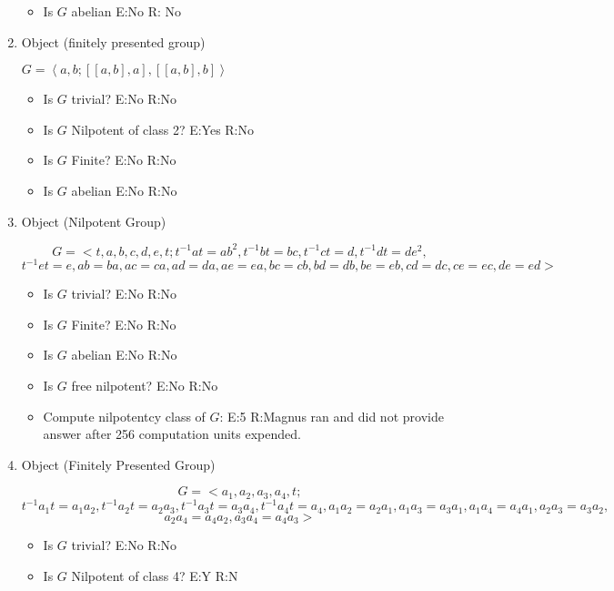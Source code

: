 \documentclass{article}
\begin{document}
\begin{enumerate}
\begin{itemize}
\item Is $G$ abelian E:No R: No
\end{itemize}
\item Object (finitely presented group)

$G=\left<a,b; [[a,b],a], [[a,b],b] \right>$

\begin{itemize}
\item Is $G$ trivial? E:No  R:No

\item Is $G$ Nilpotent of class 2? E:Yes R:No


\item Is $G$ Finite? E:No R:No

\item Is $G$ abelian E:No R:No
\end{itemize}

\item Object (Nilpotent Group)

\[G=<t,a,b,c,d,e,t; t^{-1}at=ab^2, t^{-1}bt=bc, t^{-1}ct=d,t^{-1}dt=de^2, \]\[ t^{-1}et=e, ab=ba, ac=ca, ad=da, ae=ea, bc=cb, bd=db, be=eb, cd=dc,  ce=ec, de=ed > \]

\begin{itemize}

\item Is $G$ trivial? E:No  R:No

\item Is $G$ Finite? E:No R:No

\item Is $G$ abelian E:No R:No

\item Is $G$ free nilpotent? E:No R:No

\item Compute nilpotentcy class of $G$: E:5 R:Magnus ran and did not provide answer after 256 computation units expended.
\end{itemize}

\item Object (Finitely Presented Group)

\[G=<a_1,a_2,a_3,a_4,t; \] \[ t^{-1}a_1t=a_1a_2, t^{-1}a_2t=a_2a_3,t^{-1}a_3t=a_3a_4, t^{-1}a_4t=a_4, a_1a_2=a_2a_1, a_1a_3=a_3a_1,
a_1a_4=a_4a_1, a_2a_3=a_3a_2, \]\[ a_2a_4=a_4a_2,a_3a_4=a_4a_3>\]
\begin{itemize}

\item Is $G$ trivial? E:No  R:No

\item Is $G$ Nilpotent of class 4? E:Y R:N


\end{itemize}
\end{enumerate}
\end{document}
